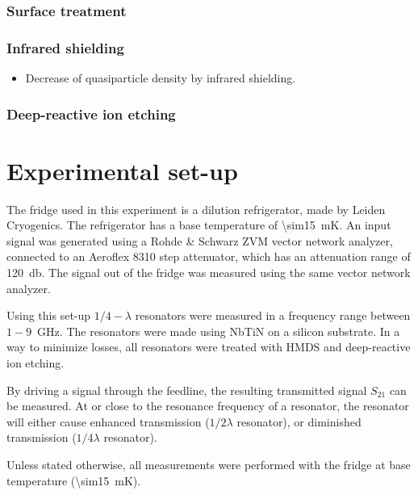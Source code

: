 \documentclass[12pt]{report}
\begin{document}
\subsubsection{Surface treatment}



\subsubsection{Infrared shielding}



\begin{itemize}
    \item Decrease of quasiparticle density by infrared shielding.
\end{itemize}


\subsubsection{Deep-reactive ion etching}




\section{Experimental set-up}

The fridge used in this experiment is a dilution refrigerator, made by Leiden Cryogenics. The refrigerator has a base temperature of \SI{\sim15}{\milli \kelvin}. An input signal was generated using a Rohde \& Schwarz ZVM vector network analyzer, connected to an Aeroflex 8310 step attenuator, which has an attenuation range of \SI{120}{\decibel}. The signal out of the fridge was measured using the same vector network analyzer.

Using this set-up $1/4 - \lambda$ resonators were measured in a frequency range between $1-9$\SI{}{\giga \hertz}. The resonators were made using NbTiN on a silicon substrate. In a way to minimize losses, all resonators were treated with HMDS and deep-reactive ion etching.

By driving a signal through the feedline, the resulting transmitted signal $S_{21}$ can be measured. At or close to the resonance frequency of a resonator, the resonator will either cause enhanced transmission ($1/2 \lambda$ resonator), or diminished transmission ($1/4 \lambda$ resonator).

Unless stated otherwise, all measurements were performed with the fridge at base temperature (\SI{\sim15}{\milli \kelvin}).
\end{document}
